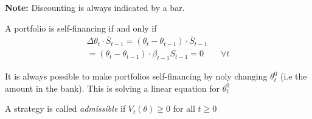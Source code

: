 \noindent\textbf{Note:} Discounting is always indicated by a bar.
\par\bigskip
\noindent A portfolio is self-financing if and only if 
\begin{equation*}
  \begin{gathered}
    \Delta\theta_t \cdot\overline{S}_{t-1} = (\theta_t-\theta_{t-1})\cdot\overline{S}_{t-1}\\
    =(\theta_t-\theta_{t-1})\cdot\beta_{t-1}S_{t-1} = 0\qquad\forall t
  \end{gathered}
\end{equation*}\par
\noindent It is always possible to make portfolios self-financing by noly changing $\theta_t^0$ (i.e the amount in the bank). This is solving a linear equation for $\theta_t^0$
\par\bigskip
\noindent A strategy is called \textit{admissible} if $V_t(\theta)\geq0$ for all $t\geq0$\par

